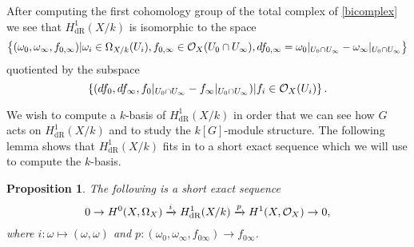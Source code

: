 \documentclass[draft, 11pt]{article} %
\theoremstyle{plain}
\newtheorem{prop}[defn]{Proposition}
\theoremstyle{remark}
\newcommand{\cO}{{\cal O}}
\newcommand{\ra}{\rightarrow}
\newcommand{\derhamhone}{H_{\text {dR}}^1(X/k)}
\begin{document}
After computing the first cohomology group of the total complex of \eqref{bicomplex} we see that $\derhamhone$ is isomorphic to the space
\begin{equation}\label{derhamconditions}
\left\{(\omega_0, \omega_\infty, f_{0,\infty}) | \omega_i\in \Omega_{X/k}(U_i), f_{0,\infty}\in \cO_X(U_0 \cap U_\infty), df_{0,\infty} = \omega_0|_{U_0\cap U_\infty} - \omega_\infty|_{U_0\cap U_\infty} \right\}
\end{equation}
quotiented by the subspace
\begin{equation}\label{quotient}
\left\{  (df_0, df_\infty, f_0|_{U_0\cap U_\infty} -f_\infty|_{U_0\cap U_\infty} )|f_i \in \cO_X(U_i)\right\}.
\end{equation}

We wish to compute a $k$-basis of $\derhamhone$ in order that we can see how $G$ acts on $\derhamhone$ and to study the $k[G]$-module structure.
The following lemma shows that $\derhamhone$ fits in to a short exact sequence which we will use to compute the $k$-basis.
\begin{prop}\label{ses}
The following is a short exact sequence
\begin{equation}\label{equationses}
0 \ra H^0(X,\Omega_X) \xrightarrow{i} \derhamhone \xrightarrow{p} H^1(X,\cO_X) \ra 0, 
\end{equation}
where $i \colon \omega \mapsto (\omega, \omega)$ and $p \colon (\omega_0, \omega_\infty, f_{0 \infty}) \to f_{0 \infty}$.
\end{prop}
\end{document}
